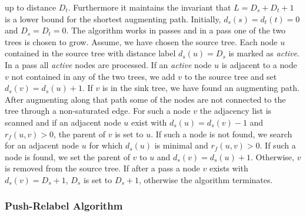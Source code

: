 up to distance $D_t$. Furthermore it maintains the invariant that $L = D_s + D_t + 1$ is a lower bound
for the shortest augmenting path. Initially, $d_s(s) = d_t(t) = 0$ and $D_s = D_t = 0$.
The algorithm works in passes and in a pass one of the two trees is chosen to grow. Assume, we have chosen
the source tree. Each node $u$ contained in the source tree with distance label $d_s(u) = D_s$ is
marked as \emph{active}. In a pass all \emph{active} nodes are processed. If an \emph{active} node
$u$ is adjacent to a node $v$ not contained in any of the two trees, we add $v$ to the source tree
and set $d_s(v) = d_s(u) + 1$. If $v$ is in the sink tree, we have found an augmenting path.
After augmenting along that path some of the nodes are not connected to the tree through a non-saturated
edge. For such a node $v$ the adjacency list is scanned and if an adjacent node $u$ exist with
$d_s(u) = d_s(v) - 1$ and $r_f(u,v) > 0$, the parent of $v$ is set to $u$. If such a node is not found,
we search for an adjacent node $u$ for which $d_s(u)$ is minimal and $r_f(u,v) > 0$. If such
a node is found, we set the parent of $v$ to $u$ and $d_s(v) = d_s(u) + 1$. Otherwise, $v$ is removed
from the source tree. If after a pass a node $v$ exists with $d_s(v) = D_s + 1$, $D_s$ is set to $D_s + 1$,
otherwise the algorithm terminates.

\subsubsection{Push-Relabel Algorithm}
\label{sec:push_relabel}

